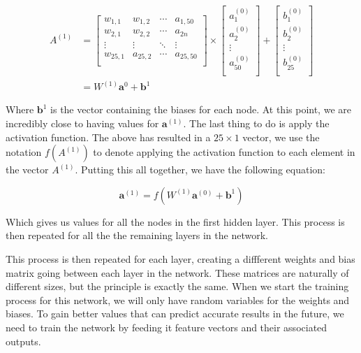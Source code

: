 \begin{align}
    A^{(1)} &= \left[ {\begin{array}{cccc}
        w_{1,1} & w_{1,2} & \cdots & a_{1,50}\\
        w_{2,1} & w_{2,2} & \cdots & a_{2n}\\
        \vdots & \vdots & \ddots & \vdots\\
        w_{25,1} & a_{25,2} & \cdots & a_{25,50}\\
      \end{array} } \right] \times \left[ \begin{array}{c}
          a^{(0)}_1 \\
          a^{(0)}_2 \\
          \vdots \\
          a^{(0)}_{50} \\
      \end{array} \right] + \left[ \begin{array}{c}
        b^{(0)}_1 \\
        b^{(0)}_2 \\
        \vdots \\
        b^{(0)}_{25} \\
        \end{array} \right] \\
      &= W^{(1)}\textbf{a}^{0} + \textbf{b}^1
\end{align}

Where $\textbf{b}^1$ is the vector containing the biases for each node.  At this point, we are incredibly close to having values for $\textbf{a}^{(1)}$. The last thing to do
is apply the activation function. The above has resulted in a $25\times 1$ vector, we use the notation $f(A^{(1)})$ to denote applying the activation function to each 
element in the vector $A^{(1)}$. Putting this all together, we have the following equation:

\begin{equation}
    \textbf{a}^{(1)} = f(W^{(1)}\textbf{a}^{(0)} + \textbf{b}^{1})
\end{equation}

Which gives us values for all the nodes in the first hidden layer. This process is then repeated for all the the remaining layers in the network. 

This process is then repeated for each layer, creating a diffferent weights and bias matrix going between each layer in the network. These matrices are naturally of different sizes, but the principle is exactly the same.
When we start the training process for this network, we will only have random variables for the weights and biases. To gain better values that can predict accurate results in the future,
we need to train the network by feeding it feature vectors and their associated outputs. \\

